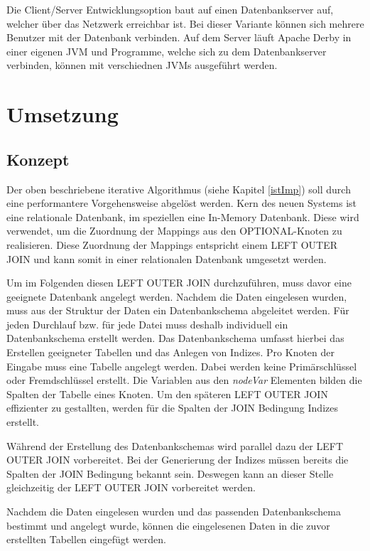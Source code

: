 \documentclass[draft,final]{vutinfth} %
\begin{document}
Die Client/Server Entwicklungsoption baut auf einen Datenbankserver auf, welcher über das Netzwerk erreichbar ist. Bei dieser Variante können sich mehrere Benutzer mit der Datenbank verbinden. Auf dem Server läuft Apache Derby in einer eigenen JVM und Programme, welche sich zu dem Datenbankserver verbinden, können mit verschiednen JVMs ausgeführt werden.


 
\cite{ApaDoc}

\chapter{Umsetzung} \label{umsetzung}
\section{Konzept}
Der oben beschriebene iterative Algorithmus (siehe Kapitel \ref{istImp}) soll durch eine performantere Vorgehensweise abgelöst werden. Kern des neuen Systems ist eine relationale Datenbank, im speziellen eine In-Memory Datenbank. Diese wird verwendet, um die Zuordnung der Mappings aus den OPTIONAL-Knoten zu realisieren. Diese Zuordnung der Mappings entspricht einem LEFT OUTER JOIN und kann somit in einer relationalen Datenbank umgesetzt werden.

Um im Folgenden diesen LEFT OUTER JOIN durchzuführen, muss davor eine geeignete Datenbank angelegt werden. Nachdem die Daten eingelesen wurden, muss aus der Struktur der Daten ein Datenbankschema abgeleitet werden. Für jeden Durchlauf bzw. für jede Datei muss deshalb individuell ein Datenbankschema erstellt werden. Das Datenbankschema umfasst hierbei das Erstellen geeigneter Tabellen und das Anlegen von Indizes. Pro Knoten der Eingabe muss eine Tabelle angelegt werden. Dabei werden keine Primärschlüssel oder Fremdschlüssel erstellt. Die Variablen aus den \textit{nodeVar} Elementen bilden die Spalten der Tabelle eines Knoten. Um den späteren LEFT OUTER JOIN effizienter zu gestallten, werden für die Spalten der JOIN Bedingung Indizes erstellt.

Während der Erstellung des Datenbankschemas wird parallel dazu der LEFT OUTER JOIN vorbereitet. Bei der Generierung der Indizes müssen bereits die Spalten der JOIN Bedingung bekannt sein. Deswegen kann an dieser Stelle gleichzeitig der LEFT OUTER JOIN vorbereitet werden.

Nachdem die Daten eingelesen wurden und das passenden Datenbankschema bestimmt und angelegt wurde, können die eingelesenen Daten in die zuvor erstellten Tabellen eingefügt werden. 
\end{document}
